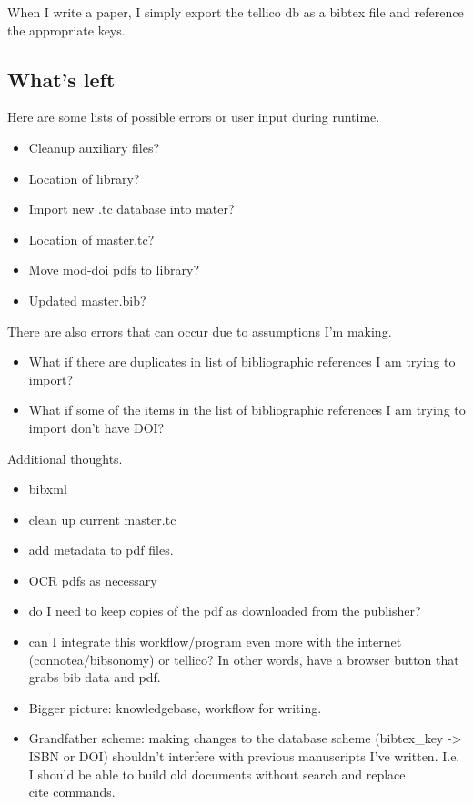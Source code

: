 \documentclass[letterpaper,12pt]{article}
\begin{document}
When I write a paper, I simply export the tellico db as a bibtex file and reference the appropriate keys.

\subsection{What's left}
Here are some lists of possible errors or user input during runtime.

\begin{itemize}
\item Cleanup auxiliary files?
\item Location of library?
\item Import new .tc database into mater?
\item Location of master.tc?
\item Move mod-doi pdfs to library?
\item Updated master.bib?
\end{itemize}

There are also errors that can occur due to assumptions I'm making.

\begin{itemize}
\item What if there are duplicates in list of bibliographic references I am trying to import?
\item What if some of the items in the list of bibliographic references I am trying to import don't have DOI?
\end{itemize}

Additional thoughts.

\begin{itemize}
\item bibxml
\item clean up current master.tc
\item add metadata to pdf files.
\item OCR pdfs as necessary
\item do I need to keep copies of the pdf as downloaded from the publisher?
\item can I integrate this workflow/program even more with the internet (connotea/bibsonomy) or tellico? In other words, have a browser button that grabs bib data and pdf.
\item Bigger picture: knowledgebase, workflow for writing.
\item Grandfather scheme: making changes to the database scheme (bibtex\_key -> ISBN or DOI) shouldn't interfere with previous manuscripts I've written. I.e. I should be able to build old documents without search and replace \\cite commands.
\end{itemize}
\end{document}

